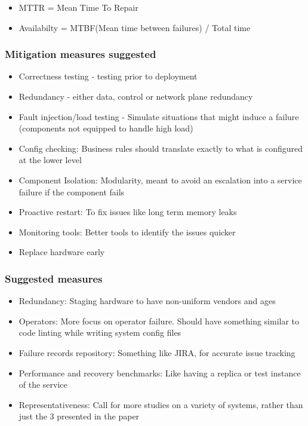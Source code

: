 \documentclass[a4paper]{article}
\begin{document}
\begin{itemize}
\item
    MTTR = Mean Time To Repair
\item
    Availabilty = MTBF(Mean time between failures) / Total time
\end{itemize}

\subsubsection{Mitigation measures suggested}

\begin{itemize}
\item
    Correctness testing - testing prior to deployment
\item
    Redundancy - either data, control or network plane redundancy
\item
    Fault injection/load testing - Simulate situations that might induce a
    failure (components not equipped to handle high load)
\item
    Config checking: Business rules should translate exactly to what is
    configured at the lower level
\item
    Component Isolation: Modularity, meant to avoid an escalation into a
    service failure if the component fails
\item
    Proactive restart: To fix issues like long term memory leaks
\item
    Monitoring tools: Better tools to identify the issues quicker
\item
    Replace hardware early
\end{itemize}

\subsubsection{Suggested measures}

\begin{itemize}
\item
    Redundancy: Staging hardware to have non-uniform vendors and ages
\item
    Operators: More focus on operator failure. Should have something
    similar to code linting while writing system config files
\item
    Failure records repository: Something like JIRA, for accurate issue
    tracking
\item
    Performance and recovery benchmarks: Like having a replica or test
    instance of the service
\item
    Representativeness: Call for more studies on a variety of systems,
    rather than just the 3 presented in the paper
\end{itemize}
\end{document}
